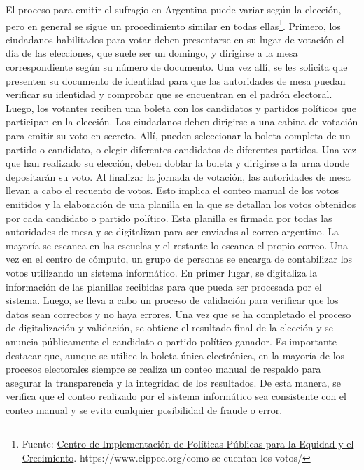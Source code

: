 El proceso para emitir el sufragio en Argentina puede variar según la elección, pero en general se sigue un
procedimiento similar en todas ellas\footnote{Fuente: \href{https://www.cippec.org/como-se-cuentan-los-votos/}{Centro
        de Implementación de Políticas Públicas para la Equidad y el Crecimiento}.
    https://www.cippec.org/como-se-cuentan-los-votos/}. Primero, los ciudadanos habilitados para votar deben presentarse en
su lugar de votación el día de las elecciones, que suele ser un domingo, y dirigirse a la mesa correspondiente según su
número de documento. Una vez allí, se les solicita que presenten su documento de identidad para que las autoridades de
mesa puedan verificar su identidad y comprobar que se encuentran en el padrón electoral. Luego, los votantes reciben
una boleta con los candidatos y partidos políticos que participan en la elección. Los ciudadanos deben dirigirse a una
cabina de votación para emitir su voto en secreto. Allí, pueden seleccionar la boleta completa de un partido o
candidato, o elegir diferentes candidatos de diferentes partidos. Una vez que han realizado su elección, deben doblar
la boleta y dirigirse a la urna donde depositarán su voto. Al finalizar la jornada de votación, las autoridades de mesa
llevan a cabo el recuento de votos. Esto implica el conteo manual de los votos emitidos y la elaboración de una
planilla en la que se detallan los votos obtenidos por cada candidato o partido político. Esta planilla es firmada por
todas las autoridades de mesa y se digitalizan para ser enviadas al correo argentino. La mayoría se escanea en las
escuelas y el restante lo escanea el propio correo. Una vez en el centro de cómputo, un grupo de personas se encarga de
contabilizar los votos utilizando un sistema informático. En primer lugar, se digitaliza la información de las
planillas recibidas para que pueda ser procesada por el sistema. Luego, se lleva a cabo un proceso de validación para
verificar que los datos sean correctos y no haya errores. Una vez que se ha completado el proceso de digitalización y
validación, se obtiene el resultado final de la elección y se anuncia públicamente el candidato o partido político
ganador. Es importante destacar que, aunque se utilice la boleta única electrónica, en la mayoría de los procesos
electorales siempre se realiza un conteo manual de respaldo para asegurar la transparencia y la integridad de los
resultados. De esta manera, se verifica que el conteo realizado por el sistema informático sea consistente con el
conteo manual y se evita cualquier posibilidad de fraude o error.

